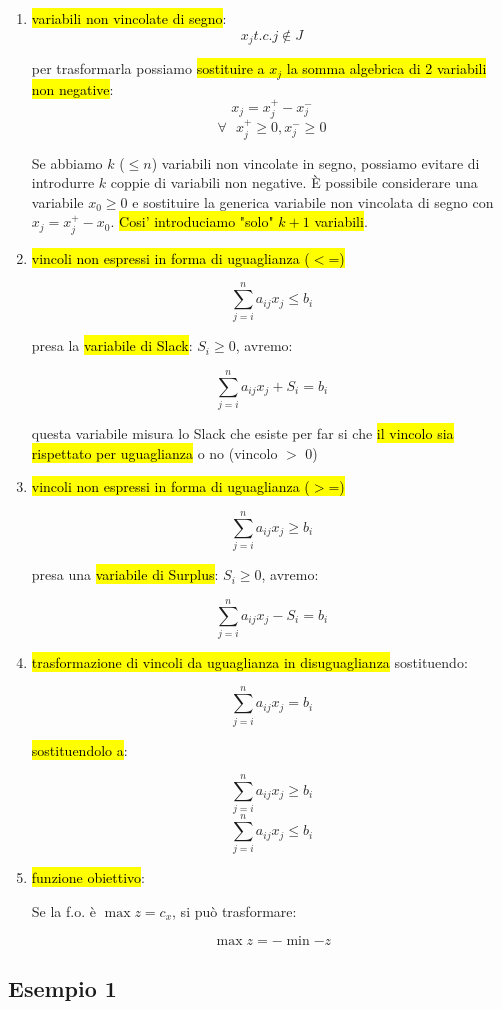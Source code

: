 \begin{enumerate}
	\item \hl{variabili non vincolate di segno}: $$x_j t.c. j \notin J$$

		per trasformarla possiamo \hl{sostituire a $x_j$ la somma algebrica di 2 variabili non negative}: $$x_j = x_j^+ - x_j^-$$ $$\forall\ \ \ x_j^+ \geq 0, x_j^- \geq 0$$

		Se abbiamo $k$ ($\leq n$) variabili non vincolate in segno, possiamo evitare di introdurre $k$ coppie di variabili non negative. È possibile considerare una variabile $x_0 \geq 0$ e sostituire la generica variabile non vincolata di segno con $x_j = x_j^+ - x_0$. \hl{Cosi' introduciamo "solo" $k+1$ variabili}.
	
	\item \hl{vincoli non espressi in forma di uguaglianza ($<$=)}
		
		$$\sum_{j=i}^n a_{ij} x_j \leq b_i$$
		
		presa la \hl{variabile di Slack}: $S_i \geq 0$, avremo:
	
		$$\sum_{j=i}^n a_{ij} x_j + S_i = b_i$$
	
	
		questa variabile misura lo Slack che esiste per far si che \hl{il vincolo sia rispettato per uguaglianza} o no (vincolo $>$ 0)
		
	\item \hl{vincoli non espressi in forma di uguaglianza ($>$=)}
	
		$$\sum_{j=i}^n a_{ij} x_j \geq b_i$$
		
		presa una \hl{variabile di Surplus}: $S_i \geq 0$, avremo:
		
		$$\sum_{j=i}^n a_{ij} x_j - S_i = b_i$$
		
	\item \hl{trasformazione di vincoli da uguaglianza in disuguaglianza} sostituendo:

		$$\sum_{j=i}^n a_{ij} x_j = b_i$$
		
		\hl{sostituendolo a}:
		
		$$\sum_{j=i}^n a_{ij} x_j \geq b_i$$
		$$\sum_{j=i}^n a_{ij} x_j \leq b_i$$
		
	\item \hl{funzione obiettivo}:
	
		Se la f.o. è $\max z = c_x$, si può trasformare:
	
		$$\max z = -\min {-z}$$

	
\end{enumerate}


\subsection{Esempio 1}

